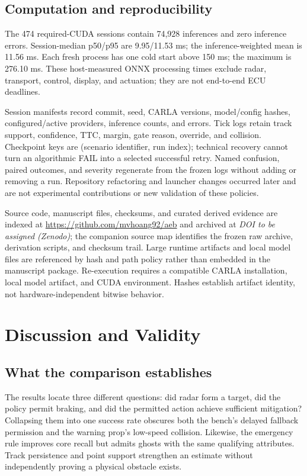 \documentclass[conference]{IEEEtran}
\newcommand{\artifactdoi}{\textit{DOI to be assigned (Zenodo)}}
\begin{document}
\subsection{Computation and reproducibility}
The 474 required-CUDA sessions contain 74,928 inferences and zero inference
errors. Session-median p50/p95 are 9.95/11.53 ms; the inference-weighted mean is
11.56 ms. Each fresh process has one cold start above 150 ms; the maximum is
276.10 ms. These host-measured ONNX processing times exclude radar, transport,
control, display, and actuation; they are not end-to-end ECU deadlines.

Session manifests record commit, seed, CARLA versions, model/config hashes,
configured/active providers, inference counts, and errors. Tick logs retain
track support, confidence, TTC, margin, gate reason, override, and collision.
Checkpoint keys are (scenario identifier, run index); technical recovery cannot
turn an algorithmic FAIL into a selected successful retry. Named confusion,
paired outcomes, and severity regenerate from the frozen logs without adding
or removing a run. Repository refactoring and launcher changes occurred later
and are not experimental contributions or new validation of these policies.

Source code, manuscript files, checksums, and curated derived evidence are indexed at
\url{https://github.com/mvhoang92/aeb} and archived at \artifactdoi; the companion
source map identifies the frozen raw archive, derivation scripts, and checksum trail. Large runtime artifacts
and local model files are referenced by hash and path policy rather than embedded
in the manuscript package. Re-execution requires a compatible CARLA installation,
local model artifact, and CUDA environment.
Hashes establish artifact identity, not hardware-independent bitwise behavior.

\section{Discussion and Validity}
\subsection{What the comparison establishes}
The results locate three different questions: did radar form a target, did the
policy permit braking, and did the permitted action achieve sufficient
mitigation? Collapsing them into one success rate obscures both the bench's delayed
fallback permission and the warning prop's low-speed collision. Likewise, the emergency
rule improves core recall but admits ghosts with the same qualifying attributes.
Track persistence and point support strengthen an estimate without independently
proving a physical obstacle exists.
\end{document}
